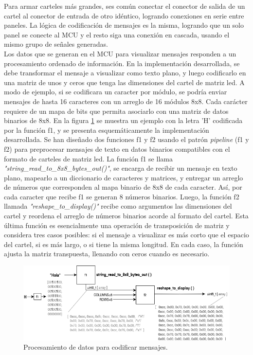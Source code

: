  Para armar carteles más grandes, ses común conectar el conector de salida de un cartel al conector de entrada de otro idéntico, logrando conexiones en serie entre paneles. La lógica de codificación de mensajes es la misma, logrando que un solo panel se conecte al MCU y el resto siga una conexión en cascada, usando el mismo grupo de señales generadas.\\
 
 
Los datos que se generan en el MCU para visualizar mensajes responden a un procesamiento ordenado de información. En la implementación desarrollada, se debe transformar el mensaje a visualizar como texto plano, y luego codificarlo en una matriz de unos y ceros que tenga las dimensiones del cartel de matriz led. A modo de ejemplo, si se codificara un caracter por módulo, se podría enviar mensajes de hasta 16 caracteres con un arreglo de 16 módulos 8x8. Cada carácter requiere de un mapa de bits que permita asociarlo con una matriz de datos binarios de 8x8. En la figura \ref{fig:dataPipeline} se muestra un ejemplo con la letra 'H' codificada por la función f1, y se presenta esquemáticamente la implementación desarrollada. Se han diseñado dos funciones f1 y f2 usando el patrón \textit{pipeline} (f1 y f2) para preprocesar mensajes de texto en datos binarios compatibles con el formato de carteles de matriz led. La función f1 se llama \textit{"string\_read\_to\_8x8\_bytes\_out()"}, se encarga de recibir un mensaje en texto plano, mapearlo a un diccionario de caracteres y matrices, y entregar un arreglo de números que corresponden al mapa binario de 8x8 de cada caracter. Así, por cada caracter que recibe f1 se generan 8 números binarios. Luego, la función f2 llamada \textit{"reshape\_to\_display()"} recibe como argumentos las dimensiones del cartel y reordena el arreglo de números binarios acorde al formato del cartel. Esta última función es esencialmente una operación de transposición de matriz y considera tres casos posibles: si el mensaje a visualizar es más corto que el espacio del cartel, si es más largo, o si tiene la misma longitud. En cada caso, la función ajusta la matriz transpuesta, llenando con ceros cuando es necesario.\\

\begin{figure}[htbp]
	\centering
	\includegraphics[width=1\textwidth]{./Figures/dataPipeline.png}
	\caption{Procesamiento de datos para codificar mensajes.}
	\label{fig:dataPipeline}
\end{figure}

